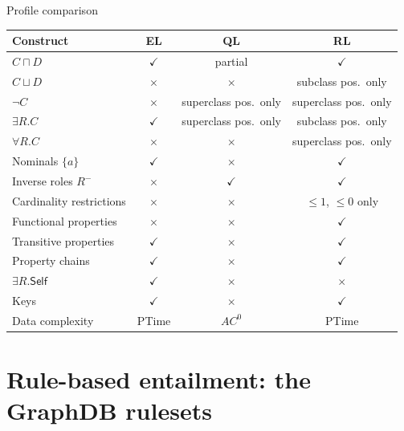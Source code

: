 \documentclass[10pt,aspectratio=169,xcolor=table]{beamer}
\newcommand{\inv}[1]{#1^{-}}
\newcommand{\tyes}{\textcolor{okgreen}{$\checkmark$}}
\newcommand{\tno}{\textcolor{nored}{$\times$}}
\begin{document}
\begin{frame}{Profile comparison}
  \centering\footnotesize
  \begin{tabular}{@{}lccc@{}}
    \toprule
    \textbf{Construct} & \textbf{EL} & \textbf{QL} & \textbf{RL}\\
    \midrule
    $C \sqcap D$                & \tyes & partial & \tyes\\
    $C \sqcup D$                & \tno  & \tno    & subclass pos.\ only\\
    $\neg C$                    & \tno  & superclass pos.\ only & superclass pos.\ only\\
    $\exists R.C$               & \tyes & superclass pos.\ only & subclass pos.\ only\\
    $\forall R.C$               & \tno  & \tno    & superclass pos.\ only\\
    Nominals $\{a\}$            & \tyes & \tno    & \tyes\\
    Inverse roles $\inv{R}$     & \tno  & \tyes   & \tyes\\
    Cardinality restrictions    & \tno  & \tno    & ${\leq}1$, ${\leq}0$ only\\
    Functional properties       & \tno  & \tno    & \tyes\\
    Transitive properties       & \tyes & \tno    & \tyes\\
    Property chains             & \tyes & \tno    & \tyes\\
    $\exists R.\mathsf{Self}$   & \tyes & \tno    & \tno\\
    Keys                        & \tyes & \tno    & \tyes\\
    \midrule
    Data complexity             & PTime & $AC^0$  & PTime\\
    \bottomrule
  \end{tabular}
\end{frame}

\section{Rule-based entailment: the GraphDB rulesets}
\end{document}

